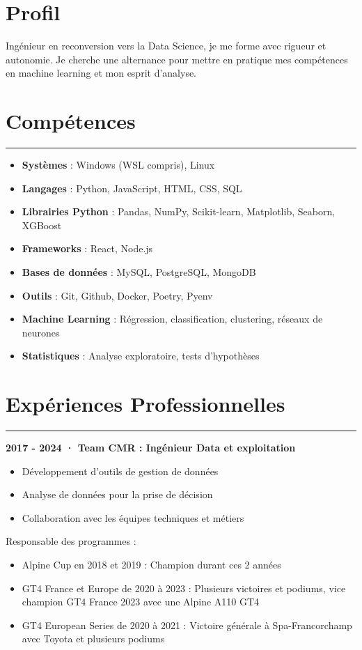 \documentclass[a4paper,12pt]{article}
\newcommand{\sectionrule}[1]{%
\section*{#1}%
\vspace{-1em}%
\noindent\rule{\linewidth}{1pt}%
\vspace{0.5em}%
}
\begin{document}
\begin{paracol}{2}
\begin{rightcolumn}
\begin{minipage}[t][\dimexpr\textheight - 9em\relax][t]{\dimexpr\linewidth - 1.5em\relax}
{  \section*{Profil}
Ingénieur en reconversion vers la Data Science, je me forme avec rigueur et autonomie.
Je cherche une alternance pour mettre en pratique mes compétences en machine learning et mon esprit d’analyse.

  
  \sectionrule{Compétences}
  \begin{itemize}[leftmargin=1em, nosep]
    \item \textbf{Systèmes} : Windows (WSL compris), Linux
    \item \textbf{Langages} : Python, JavaScript, HTML, CSS, SQL
    \item \textbf{Librairies Python} : Pandas, NumPy, Scikit-learn, Matplotlib, Seaborn, XGBoost
    \item \textbf{Frameworks} : React, Node.js
    \item \textbf{Bases de données} : MySQL, PostgreSQL, MongoDB
    \item \textbf{Outils} : Git, Github, Docker, Poetry, Pyenv
    \item \textbf{Machine Learning} : Régression, classification, clustering, réseaux de neurones
    \item \textbf{Statistiques} : Analyse exploratoire, tests d’hypothèses
  \end{itemize}
  \sectionrule{Expériences Professionnelles}
  \textbf{2017 - 2024 · Team CMR : Ingénieur Data et exploitation}
  \begin{itemize}[leftmargin=1em, nosep]
    \item Développement d'outils de gestion de données
    \item Analyse de données pour la prise de décision
    \item Collaboration avec les équipes techniques et métiers\\
  \end{itemize}
  Responsable des programmes :
  \begin{itemize}[leftmargin=1em, nosep]
    \item Alpine Cup en 2018 et 2019 : Champion durant ces 2 années
    \item GT4 France et Europe de 2020 à 2023 : Plusieurs victoires et podiums, vice champion GT4 France 2023 avec une Alpine A110 GT4
    \item GT4 European Series de 2020 à 2021 : Victoire générale à Spa-Francorchamp avec Toyota et plusieurs podiums \\
  \end{itemize}

}
\end{minipage}
\end{rightcolumn}
\end{paracol}
\end{document}
